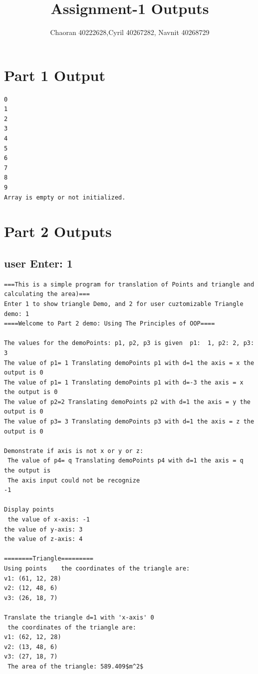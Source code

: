 \documentclass{article}
\title{Assignment-1 Outputs}
\author{Chaoran 40222628,Cyril 40267282, Navnit 40268729}
\begin{document}
\maketitle
	
\section{Part 1 Output}
\begin{lstlisting}[language={}]
0
1
2
3
4
5
6
7
8
9
Array is empty or not initialized.
\end{lstlisting}

\section{Part 2 Outputs}
\subsection{user Enter: 1}
\begin{lstlisting}[language={}]
===This is a simple program for translation of Points and triangle and calculating the area)===
Enter 1 to show triangle Demo, and 2 for user cuztomizable Triangle demo: 1
====Welcome to Part 2 demo: Using The Principles of OOP====

The values for the demoPoints: p1, p2, p3 is given  p1:  1, p2: 2, p3: 3
The value of p1= 1 Translating demoPoints p1 with d=1 the axis = x the output is 0
The value of p1= 1 Translating demoPoints p1 with d=-3 the axis = x the output is 0
The value of p2=2 Translating demoPoints p2 with d=1 the axis = y the output is 0
The value of p3= 3 Translating demoPoints p3 with d=1 the axis = z the output is 0

Demonstrate if axis is not x or y or z:
 The value of p4= q Translating demoPoints p4 with d=1 the axis = q the output is
 The axis input could not be recognize
-1

Display points
 the value of x-axis: -1
the value of y-axis: 3
the value of z-axis: 4

========Triangle=========
Using points    the coordinates of the triangle are:
v1: (61, 12, 28)
v2: (12, 48, 6)
v3: (26, 18, 7)

Translate the triangle d=1 with 'x-axis' 0
 the coordinates of the triangle are:
v1: (62, 12, 28)
v2: (13, 48, 6)
v3: (27, 18, 7)
 The area of the triangle: 589.409$m^2$
\end{lstlisting}
\end{document}
